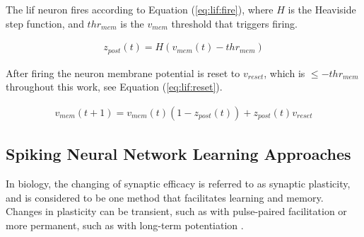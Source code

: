 \documentclass[conference]{IEEEtran}
\newcommand{\asvgf}[4]{
	\begin{figure}[htbp]
    	\centering
		\adjustbox{max width=#4\linewidth}{}
        \caption{#2.}
        \label{#3}
	\end{figure}
}
\newcommand{\eq}[1]{Equation (\ref{#1})}
\begin{document}
The \gls{lif} neuron fires according to \eq{eq:lif:fire}, where $H$ is the
Heaviside step function, and $thr_{mem}$ is the $v_{mem}$ threshold that
triggers firing.

\begin{align}
z_{post}(t) = H(v_{mem}(t) - thr_{mem}) \label{eq:lif:fire}
\end{align}

After firing the neuron membrane potential is reset to $v_{reset}$, which is
$\leq -thr_{mem}$ throughout this work, see \eq{eq:lif:reset}.

\begin{align}
v_{mem}(t+1) = v_{mem}(t)(1 - z_{post}(t)) + z_{post}(t)v_{reset} \label{eq:lif:reset}
\end{align}




\subsection{Spiking Neural Network Learning Approaches}
In biology, the changing of synaptic efficacy is referred to as synaptic
plasticity, and is considered to be one method that facilitates learning and
memory. Changes in plasticity can be transient, such as with pulse-paired
facilitation or more permanent, such as with long-term potentiation
\parencite{ponulak_2011}.
\end{document}
